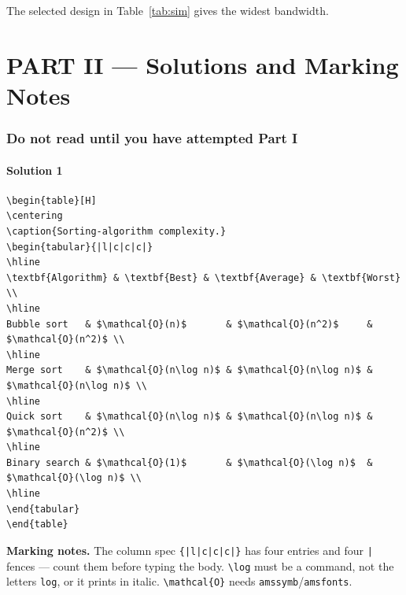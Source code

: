 \documentclass[11pt]{article}
\begin{document}
The selected design in Table~\ref{tab:sim} gives the widest bandwidth.

\clearpage
\part*{PART II --- Solutions and Marking Notes}
\section*{Do not read until you have attempted Part I}

\subsection*{Solution 1}
\begin{lstlisting}[style=tex]
\begin{table}[H]
\centering
\caption{Sorting-algorithm complexity.}
\begin{tabular}{|l|c|c|c|}
\hline
\textbf{Algorithm} & \textbf{Best} & \textbf{Average} & \textbf{Worst} \\
\hline
Bubble sort   & $\mathcal{O}(n)$       & $\mathcal{O}(n^2)$     & $\mathcal{O}(n^2)$ \\
\hline
Merge sort    & $\mathcal{O}(n\log n)$ & $\mathcal{O}(n\log n)$ & $\mathcal{O}(n\log n)$ \\
\hline
Quick sort    & $\mathcal{O}(n\log n)$ & $\mathcal{O}(n\log n)$ & $\mathcal{O}(n^2)$ \\
\hline
Binary search & $\mathcal{O}(1)$       & $\mathcal{O}(\log n)$  & $\mathcal{O}(\log n)$ \\
\hline
\end{tabular}
\end{table}
\end{lstlisting}
\textbf{Marking notes.} The column spec \verb!{|l|c|c|c|}! has four entries and
four \verb!|! fences --- count them before typing the body. \verb|\log| must be
a command, not the letters \texttt{log}, or it prints in italic. \verb|\mathcal{O}|
needs \texttt{amssymb}/\texttt{amsfonts}.

\end{document}
